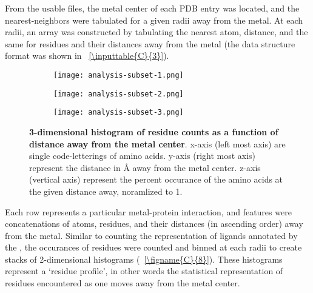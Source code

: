 \documentclass[../main/main]{subfiles}
\begin{document}
From the usable files, the metal center of each PDB entry was located, and the nearest-neighbors were tabulated for a given radii away from the metal. At each radii, an array was constructed by tabulating the nearest atom, distance, and the same for residues and their distances away from the metal (the data structure format was shown in \TABLE~\ref{\inputtable{C}{3}}). 

\clearpage %
\begin{figure}[H]
	\begin{subfigure}[h]{\textwidth}
		\centering
		\texttt{[image: analysis-subset-1.png]}
	\end{subfigure}
\end{figure}
%
\vspace{-2\baselineskip}
%
\begin{figure}[H]\ContinuedFloat
	\begin{subfigure}[h]{\textwidth}
		\centering
		\texttt{[image: analysis-subset-2.png]}
	\end{subfigure}
\end{figure}
%
\vspace{-2\baselineskip}
%
\begin{figure}[H]\ContinuedFloat
	\begin{subfigure}[h]{\textwidth}
		\centering
		\texttt{[image: analysis-subset-3.png]}
	\end{subfigure}
	\caption[3-dimensional histogram of residue counts as a function of distance away from the metal center]
	{
		\textbf{3-dimensional histogram of residue counts as a function of distance away from the metal center}.
		x-axis (left most axis) are single code-letterings of amino acids. y-axis (right most axis) represent the distance in \AA{} away from the metal center. z-axis (vertical axis) represent the percent occurance of the amino acids at the given distance away, noramlized to 1.
	}
	\label{\figname{C}{9}}
\end{figure}


\noindent Each row represents a particular metal-protein interaction, and features were concatenations of atoms, residues, and their distances (in ascending order) away from the metal. Similar to counting the representation of ligands annotated by the \mPDB{}, the occurances of residues were counted and binned at each radii to create stacks of 2-dimensional histograms (\FIGURE~\ref{\figname{C}{8}}). These histograms represent a `residue profile', in other words the statistical representation of residues encountered as one moves away from the metal center.
\end{document}
